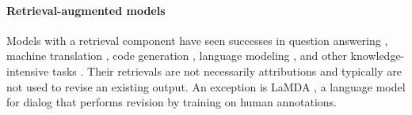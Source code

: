 \paragraph{Retrieval-augmented models}
Models with a retrieval component have seen successes in question answering \cite{chen2017reading,lee2019latent,nakano2021webgpt}, machine translation \cite{zhang2018guiding}, code generation \cite{hayati2018retrieval}, language modeling \cite{khandelwal2019generalization}, and other knowledge-intensive tasks \cite{lewis2020rag}.
Their retrievals are not necessarily attributions \cite{dziri2022origin,longpre2021entity}
and typically are not used to revise an existing output.
An exception is LaMDA \cite{Thoppilan2022LaMDA}, a language model for dialog that performs revision by training on human annotations.



